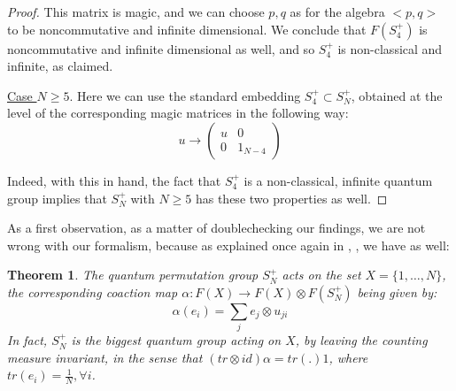 \documentclass[12pt]{amsbook}
\newtheorem{theorem}{Theorem}[chapter]
\begin{document}
\begin{proof}
This matrix is magic, and we can choose $p,q$ as for the algebra $<p,q>$ to be noncommutative and infinite dimensional. We conclude that $F(S_4^+)$ is noncommutative and infinite dimensional as well, and so $S_4^+$ is non-classical and infinite, as claimed.

\medskip

\underline{Case $N\geq5$}. Here we can use the standard embedding $S_4^+\subset S_N^+$, obtained at the level of the corresponding magic matrices in the following way:
$$u\to\begin{pmatrix}u&0\\ 0&1_{N-4}\end{pmatrix}$$

Indeed, with this in hand, the fact that $S_4^+$ is a non-classical, infinite quantum group implies that $S_N^+$ with $N\geq5$ has these two properties as well.
\end{proof}

As a first observation, as a matter of doublechecking our findings, we are not wrong with our formalism, because as explained once again in \cite{bi4}, \cite{wan}, we have as well:


\begin{theorem}
The quantum permutation group $S_N^+$ acts on the set $X=\{1,\ldots,N\}$, the corresponding coaction map $\alpha:F(X)\to F(X)\otimes F(S_N^+)$ being given by:
$$\alpha(e_i)=\sum_je_j\otimes u_{ji}$$
In fact, $S_N^+$ is the biggest quantum group acting on $X$, by leaving the counting measure invariant, in the sense that $(tr\otimes id)\alpha=tr(.)1$, where $tr(e_i)=\frac{1}{N},\forall i$.
\end{theorem}
\end{document}
